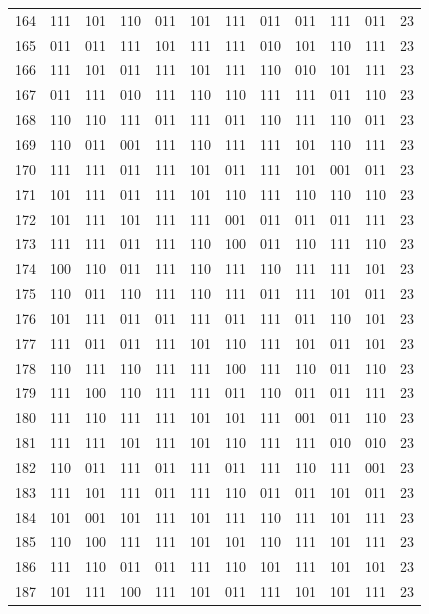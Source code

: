 \begin{longtable}{r*{10}{c}r}
164 & 111 & 101 & 110 & 011 & 101 & 111 & 011 & 011 & 111 & 011 & 23\\
165 & 011 & 011 & 111 & 101 & 111 & 111 & 010 & 101 & 110 & 111 & 23\\
166 & 111 & 101 & 011 & 111 & 101 & 111 & 110 & 010 & 101 & 111 & 23\\
167 & 011 & 111 & 010 & 111 & 110 & 110 & 111 & 111 & 011 & 110 & 23\\
168 & 110 & 110 & 111 & 011 & 111 & 011 & 110 & 111 & 110 & 011 & 23\\
169 & 110 & 011 & 001 & 111 & 110 & 111 & 111 & 101 & 110 & 111 & 23\\
170 & 111 & 111 & 011 & 111 & 101 & 011 & 111 & 101 & 001 & 011 & 23\\
171 & 101 & 111 & 011 & 111 & 101 & 110 & 111 & 110 & 110 & 110 & 23\\
172 & 101 & 111 & 101 & 111 & 111 & 001 & 011 & 011 & 011 & 111 & 23\\
173 & 111 & 111 & 011 & 111 & 110 & 100 & 011 & 110 & 111 & 110 & 23\\
174 & 100 & 110 & 011 & 111 & 110 & 111 & 110 & 111 & 111 & 101 & 23\\
175 & 110 & 011 & 110 & 111 & 110 & 111 & 011 & 111 & 101 & 011 & 23\\
176 & 101 & 111 & 011 & 011 & 111 & 011 & 111 & 011 & 110 & 101 & 23\\
177 & 111 & 011 & 011 & 111 & 101 & 110 & 111 & 101 & 011 & 101 & 23\\
178 & 110 & 111 & 110 & 111 & 111 & 100 & 111 & 110 & 011 & 110 & 23\\
179 & 111 & 100 & 110 & 111 & 111 & 011 & 110 & 011 & 011 & 111 & 23\\
180 & 111 & 110 & 111 & 111 & 101 & 101 & 111 & 001 & 011 & 110 & 23\\
181 & 111 & 111 & 101 & 111 & 101 & 110 & 111 & 111 & 010 & 010 & 23\\
182 & 110 & 011 & 111 & 011 & 111 & 011 & 111 & 110 & 111 & 001 & 23\\
183 & 111 & 101 & 111 & 011 & 111 & 110 & 011 & 011 & 101 & 011 & 23\\
184 & 101 & 001 & 101 & 111 & 101 & 111 & 110 & 111 & 101 & 111 & 23\\
185 & 110 & 100 & 111 & 111 & 101 & 101 & 110 & 111 & 101 & 111 & 23\\
186 & 111 & 110 & 011 & 011 & 111 & 110 & 101 & 111 & 101 & 101 & 23\\
187 & 101 & 111 & 100 & 111 & 101 & 011 & 111 & 101 & 101 & 111 & 23\\

\end{longtable}

